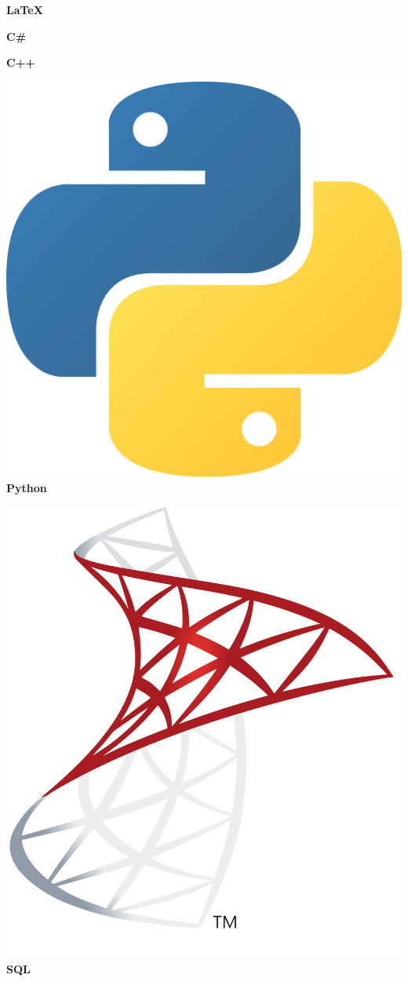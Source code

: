 \documentclass[a4paper]{friggeri-cv}
\begin{document}
\begin{aside}
        \textbf{\LaTeX}%

        \textbf{C\#}%

        \textbf{C++}%

        \includegraphics[scale=0.0045]{../assets/images/Python_logo.png} \textbf{Python}%

        \includegraphics[scale=0.008]{../assets/images/SQL_logo.png} \textbf{SQL}%


\end{aside}
\end{document}
